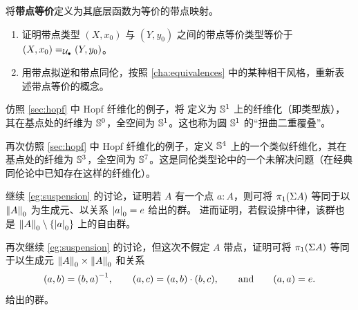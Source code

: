 \begin{ex}\label{ex:pointed-equivalences}
  将\textbf{带点等价}定义为其底层函数为等价的带点映射。
  \begin{enumerate}
  \item 证明带点类型 $(X,x_0)$ 与 $(Y,y_0)$ 之间的带点等价类型等价于 $\id[\pointed\type]{(X,x_0)}{(Y,y_0)}$。
  \item 用带点拟逆和带点同伦，按照 \cref{cha:equivalences} 中的某种相干风格，重新表述带点等价的概念。
  \end{enumerate}
\end{ex}

\begin{ex}\label{ex:HopfJr}
  仿照 \cref{sec:hopf} 中 Hopf 纤维化的例子，将 
定义为 $\Sn ^1$ 上的纤维化（即类型族），其在基点处的纤维为 $\Sn ^0$，全空间为 $\Sn ^1$。这也称为圆 $\Sn ^1$ 的``扭曲二重覆叠''。
\end{ex}

\begin{ex}\label{ex:SuperHopf}
再次仿照 \cref{sec:hopf} 中 Hopf 纤维化的例子，定义 $\Sn ^4$ 上的一个类似纤维化，其在基点处的纤维为 $\Sn ^3$，全空间为 $\Sn ^7$。这是同伦类型论中的一个未解决问题（在经典同伦论中已知存在这样的纤维化）。
\end{ex}

\begin{ex}\label{ex:vksusppt}
  继续 \cref{eg:suspension} 的讨论，证明若 $A$ 有一个点 $a:A$，则可将 $\pi_1(\susp A)$ 等同于以 $\trunc0A$ 为生成元、以关系 $\tproj0a = e$ 给出的群。
  进而证明，若假设排中律，该群也是 $\trunc0 A \setminus \{\tproj0 a \}$ 上的自由群。
\end{ex}

\begin{ex}\label{ex:vksuspnopt}
  再次继续 \cref{eg:suspension} 的讨论，但这次不假定 $A$ 带点，证明可将 $\pi_1(\susp A)$ 等同于以生成元 $\trunc0A \times \trunc0A$ 和关系
  \begin{equation*}
    (a,b) = \opp{(b,a)},
    \qquad
    (a,c) = (a,b)\cdot (b,c),
    \qquad\text{and}\qquad
    (a,a) = e.
  \end{equation*}
  给出的群。
\end{ex}


